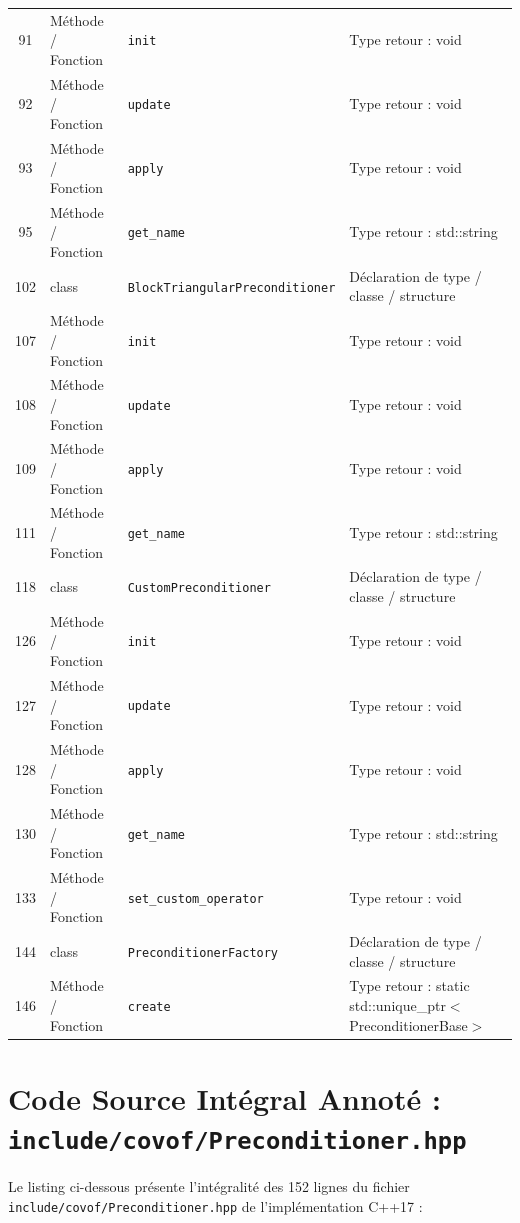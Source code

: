 \documentclass[10pt,a4paper,oneside]{book}
\begin{document}
\begin{center}
\begin{tabular}{clll}
91 & Méthode / Fonction & \texttt{init} & Type retour : void \\
92 & Méthode / Fonction & \texttt{update} & Type retour : void \\
93 & Méthode / Fonction & \texttt{apply} & Type retour : void \\
95 & Méthode / Fonction & \texttt{get\_name} & Type retour : std::string \\
102 & class & \texttt{BlockTriangularPreconditioner} & Déclaration de type / classe / structure \\
107 & Méthode / Fonction & \texttt{init} & Type retour : void \\
108 & Méthode / Fonction & \texttt{update} & Type retour : void \\
109 & Méthode / Fonction & \texttt{apply} & Type retour : void \\
111 & Méthode / Fonction & \texttt{get\_name} & Type retour : std::string \\
118 & class & \texttt{CustomPreconditioner} & Déclaration de type / classe / structure \\
126 & Méthode / Fonction & \texttt{init} & Type retour : void \\
127 & Méthode / Fonction & \texttt{update} & Type retour : void \\
128 & Méthode / Fonction & \texttt{apply} & Type retour : void \\
130 & Méthode / Fonction & \texttt{get\_name} & Type retour : std::string \\
133 & Méthode / Fonction & \texttt{set\_custom\_operator} & Type retour : void \\
144 & class & \texttt{PreconditionerFactory} & Déclaration de type / classe / structure \\
146 & Méthode / Fonction & \texttt{create} & Type retour : static std::unique\_ptr$<$PreconditionerBase$>$ \\
\bottomrule
\end{tabular}
\end{center}

\section{Code Source Intégral Annoté : \texttt{include/covof/Preconditioner.hpp}}
Le listing ci-dessous présente l'intégralité des 152 lignes du fichier \texttt{include/covof/Preconditioner.hpp} de l'implémentation C++17 :
\end{document}
